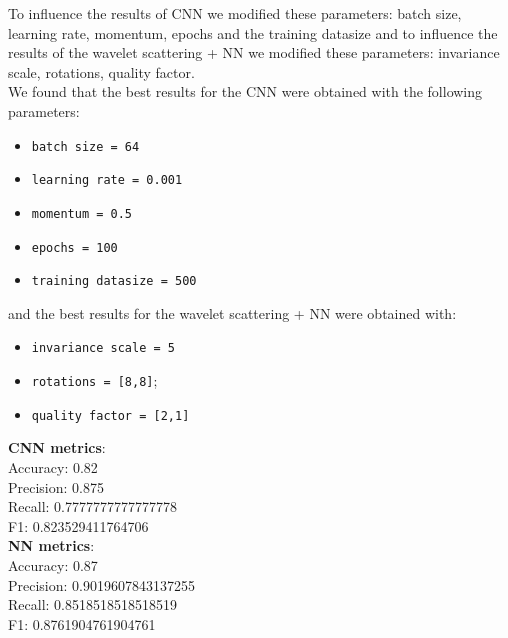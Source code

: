 \documentclass{report}
\begin{document}
To influence the results of CNN we modified these parameters: batch size, learning rate, momentum, epochs and the training datasize and to influence the results of the wavelet scattering + NN we modified these parameters: invariance scale, rotations, quality factor.\\
We found that the best results for the CNN were obtained with the following parameters:
\begin{itemize}
    \item \texttt{batch size = 64}
    \item \texttt{learning rate = 0.001}
    \item \texttt{momentum = 0.5}
    \item \texttt{epochs = 100}
    \item \texttt{training datasize = 500}
\end{itemize}
and the best results for the wavelet scattering + NN were obtained with:
\begin{itemize}
    \item \texttt{invariance scale = 5}
    \item \texttt{rotations =  [8,8]};
    \item \texttt{quality factor = [2,1]}
\end{itemize}
\textbf{CNN metrics}: \\
Accuracy:               0.82\\
Precision:              0.875\\
Recall:                 0.7777777777777778\\
F1:                     0.823529411764706\\
\textbf{NN metrics}:\\
Accuracy:               0.87\\
Precision:              0.9019607843137255\\
Recall:                 0.8518518518518519\\
F1:                             0.8761904761904761\\
\end{document}
